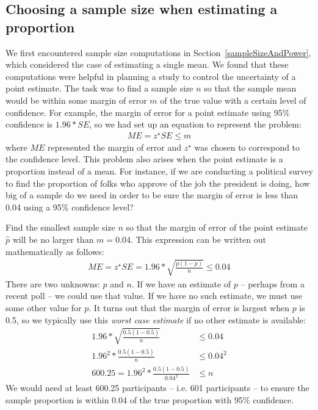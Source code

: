\vspace{-1mm}

\subsection{Choosing a sample size when estimating a proportion}

We first encountered sample size computations in Section~\ref{sampleSizeAndPower}, which considered the case of estimating a single mean. We found that these computations were helpful in planning a study to control the uncertainty of a point estimate. The task was to find a sample size $n$ so that the sample mean would be within some margin of error $m$ of the true value with a certain level of confidence. For example, the margin of error for a point estimate using 95\% confidence is $1.96*SE$, so we had set up an equation to represent the problem:
\begin{align*}
ME = z^{\star}SE \leq m
\end{align*}
where $ME$ represented the margin of error and $z^{\star}$ was chosen to correspond to the confidence level. This problem also arises when the point estimate is a proportion instead of a mean. For instance, if we are conducting a political survey to find the proportion of folks who approve of the job the president is doing, how big of a sample do we need in order to be sure the margin of error is less than 0.04 using a 95\% confidence level?

\begin{example}{Find the smallest sample size $n$ so that the margin of error of the point estimate $\hat{p}$ will be no larger than $m=0.04$.}
This expression can be written out mathematically as follows:
\begin{align*}
ME = z^{\star}SE = 1.96*\sqrt{\frac{p(1-p)}{n}} \leq 0.04
\end{align*}
There are two unknowns: $p$ and $n$. If we have an estimate of $p$ -- perhaps from a recent poll -- we could use that value. If we have no such estimate, we must use some other value for $p$. It turns out that the margin of error is largest when $p$ is 0.5, so we typically use this \emph{worst case estimate} if no other estimate is available:
\begin{align*}
	1.96*\sqrt{\frac{0.5(1-0.5)}{n}} &\leq 0.04 \\
	1.96^2*\frac{0.5(1-0.5)}{n} &\leq 0.04^2 \\
600.25 = 1.96^2*\frac{0.5(1-0.5)}{0.04^2} &\leq n
\end{align*}
We would need at least 600.25 participants -- i.e. 601 participants -- to ensure the sample proportion is within 0.04 of the true proportion with 95\% confidence.
\end{example}

